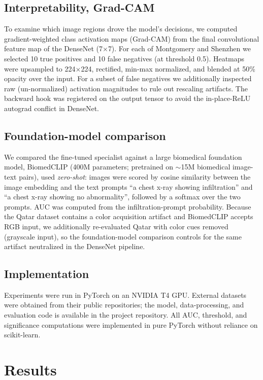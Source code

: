 \documentclass[runningheads]{llncs}
\begin{document}
\subsection{Interpretability, Grad-CAM}
To examine which image regions drove the model's decisions, we computed gradient-weighted class activation maps (Grad-CAM) \cite{selvaraju2017} from the final convolutional feature map of the DenseNet (7$\times$7). For each of Montgomery and Shenzhen we selected 10 true positives and 10 false negatives (at threshold 0.5). Heatmaps were upsampled to 224$\times$224, rectified, min-max normalized, and blended at 50\% opacity over the input. For a subset of false negatives we additionally inspected raw (un-normalized) activation magnitudes to rule out rescaling artifacts. The backward hook was registered on the output tensor to avoid the in-place-ReLU autograd conflict in DenseNet.

\subsection{Foundation-model comparison}
We compared the fine-tuned specialist against a large biomedical foundation model, BiomedCLIP (400M parameters; pretrained on $\sim$15M biomedical image-text pairs), used \emph{zero-shot}: images were scored by cosine similarity between the image embedding and the text prompts ``a chest x-ray showing infiltration'' and ``a chest x-ray showing no abnormality'', followed by a softmax over the two prompts. AUC was computed from the infiltration-prompt probability. Because the Qatar dataset contains a color acquisition artifact and BiomedCLIP accepts RGB input, we additionally re-evaluated Qatar with color cues removed (grayscale input), so the foundation-model comparison controls for the same artifact neutralized in the DenseNet pipeline.

\subsection{Implementation}
Experiments were run in PyTorch on an NVIDIA T4 GPU. External datasets were obtained from their public repositories; the model, data-processing, and evaluation code is available in the project repository. All AUC, threshold, and significance computations were implemented in pure PyTorch without reliance on scikit-learn.

\section{Results}
\end{document}
